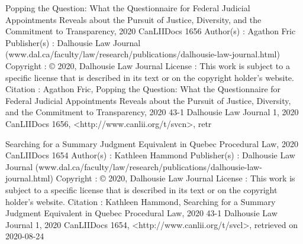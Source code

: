 



Popping the Question: What the Questionnaire for Federal Judicial Appointments Reveals about the Pursuit of Justice, Diversity, and the Commitment to Transparency, 2020 CanLIIDocs 1656
Author(s) : 	Agathon Fric
Publisher(s) : 	Dalhousie Law Journal (www.dal.ca/faculty/law/research/publications/dalhousie-law-journal.html)
Copyright : 	© 2020, Dalhousie Law Journal
License : 	This work is subject to a specific license that is described in its text or on the copyright holder's website.
Citation : 	Agathon Fric, Popping the Question: What the Questionnaire for Federal Judicial Appointments Reveals about the Pursuit of Justice, Diversity, and the Commitment to Transparency, 2020 43-1 Dalhousie Law Journal 1, 2020 CanLIIDocs 1656, <http://www.canlii.org/t/svcn>, retr



Searching for a Summary Judgment Equivalent in Quebec Procedural Law, 2020 CanLIIDocs 1654
Author(s) : 	Kathleen Hammond
Publisher(s) : 	Dalhousie Law Journal (www.dal.ca/faculty/law/research/publications/dalhousie-law-journal.html)
Copyright : 	© 2020, Dalhousie Law Journal
License : 	This work is subject to a specific license that is described in its text or on the copyright holder's website.
Citation : 	Kathleen Hammond, Searching for a Summary Judgment Equivalent in Quebec Procedural Law, 2020 43-1 Dalhousie Law Journal 1, 2020 CanLIIDocs 1654, <http://www.canlii.org/t/svcl>, retrieved on 2020-08-24




